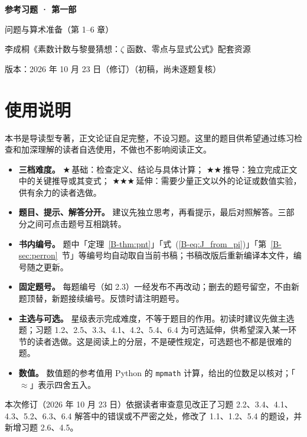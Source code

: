 \documentclass[11pt,a4paper]{article}
\newcommand{\bref}[1]{\ref*{B-#1}}
\newcommand{\lvI}{$\bigstar$\,基础}
\newcommand{\lvII}{$\bigstar\bigstar$\,推导}
\newcommand{\lvIII}{$\bigstar\bigstar\bigstar$\,延伸}
\newcommand{\versiondate}{2026 年 10 月 23 日（修订）}
\begin{document}
\begin{center}
{\LARGE\bfseries 参考习题 · 第一部\par}
\vspace{0.6em}
{\large 问题与算术准备（第 1–6 章）\par}
\vspace{0.6em}
{\normalsize 李成桐《素数计数与黎曼猜想：$\zeta$ 函数、零点与显式公式》配套资源\par}
\vspace{0.3em}
{\small 版本：\versiondate（初稿，尚未逐题复核）\par}
\end{center}

\vspace{0.8em}
\section*{使用说明}

本书是导读型专著，正文论证自足完整，不设习题。这里的题目供希望通过练习检查和加深理解的读者自选使用，不做也不影响阅读正文。

\begin{itemize}
  \item \textbf{三档难度。}
    \lvI：检查定义、结论与具体计算；
    \lvII：独立完成正文中的关键推导或其变式；
    \lvIII：需要少量正文以外的论证或数值实验，供有余力的读者选做。
  \item \textbf{题目、提示、解答分开。}
    建议先独立思考，再看提示，最后对照解答。三部分之间可点击题号互相跳转。
  \item \textbf{书内编号。}
    题中「定理~\bref{thm:pnt}」「式~(\bref{eq:J_from_pi})」「第~\bref{sec:perron}~节」等编号均自动取自当前书稿；书稿改版后重新编译本文件，编号随之更新。
  \item \textbf{固定题号。}
    每题编号（如 2.3）一经发布不再改动；删去的题号留空，不由新题顶替，新题接续编号。反馈时请注明题号。
  \item \textbf{主选与可选。}
    星级表示完成难度，不等于题目的作用。初读时建议先做主选题；习题 1.2、2.5、3.3、4.1、4.2、5.4、6.4 为可选延伸，供希望深入某一环节的读者选做。这是阅读上的分层，不是硬性规定，可选题也不都是很难的题。
  \item \textbf{数值。}
    数值题的参考值用 Python 的 \texttt{mpmath} 计算，给出的位数足以核对；「$\approx$」表示四舍五入。
\end{itemize}

本次修订（2026 年 10 月 23 日）依据读者审查意见改正了习题 2.2、3.4、4.1、4.3、5.2、6.3、6.4 解答中的错误或不严密之处，修改了 1.1、1.2、5.4 的题设，并新增习题 2.6、4.5。
\end{document}

